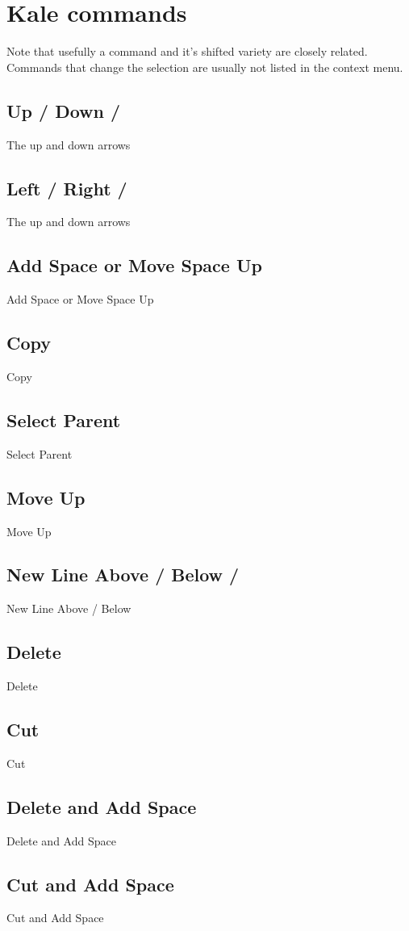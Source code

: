 \chapter{Kale commands}
\newcommand{\shortcut}[3]{\section[#1]{#1 \hfill #2}\label{cmd:#3}}

Note that usefully a command and it's shifted \keys{\shift} variety are closely
related. Commands that change the selection are usually not listed in the
context menu.

\shortcut{Up / Down}{\ak{^} / }{up_down}
The up and down arrows

\shortcut{Left / Right}{\ak{<} / \ak{>}}{left_right}
The up and down arrows

\shortcut{Add Space or Move Space Up}{\keys{\SPACE}}{smart_space}
Add Space or Move Space Up

\shortcut{Copy}{}{copy}
Copy

\shortcut{Select Parent}{}{parent}
Select Parent

\shortcut{Move Up}{}{move_up}
Move Up

\shortcut{New Line Above / Below}{ / }{new_line}
New Line Above / Below

\shortcut{Delete}{\keys{\backspace}}{delete}
Delete

\shortcut{Cut}{}{cut}
Cut

\shortcut{Delete and Add Space}{}{delete_blank}
Delete and Add Space

\shortcut{Cut and Add Space}{}{cut_blank}
Cut and Add Space